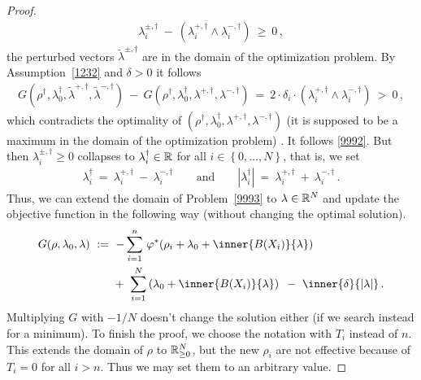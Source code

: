 \begin{proof}
\begin{gather*}
      \lambda_i^{\pm,\dagger}
      \!
      \ 
      -
      \ 
      (
      \lambda_i^{+,\dagger}
      \!
      \land
      \lambda_i^{-,\dagger}
      )
      \ 
      \ge 
      \ 
      0
      \,,
  \end{gather*}
  the perturbed vectors $\tilde{\lambda}^{\pm,\dagger}$ are  in the domain of the 
  optimization problem.
  By Assumption~\eqref{1232} and $\delta>0$ it follows
  \begin{align*}
  G
  \left( 
  \rho^\dagger,\lambda_0^\dagger,\tilde{\lambda}^{+,\dagger},\tilde{\lambda}^{-,\dagger}
  \right)
  \ 
  -
  \ 
  G
  \left( 
  \rho^\dagger,\lambda_0^\dagger,\lambda^{+,\dagger},\lambda^{-,\dagger}
  \right)
  \ 
  =
  \ 
  2
  \cdot
  \delta_i
  \cdot
      (
      \lambda_i^{+,\dagger}
      \!
      \land
      \lambda_i^{-,\dagger}
      )
  \ 
  >
  \ 
  0
  \,,
  \end{align*}
  which contradicts the optimality of
$
  (\rho^\dagger,\lambda_0^\dagger,\lambda^{+,\dagger},\lambda^{-,\dagger})
$
(it is supposed to be a maximum in the domain of the optimization problem)
.
It follows \eqref{9992}.
But then 
$
\lambda^{\pm,\dagger}_i
\ge 0
$
collapses to
$
\lambda_i^\dagger\in \mathbb{R}
$ 
for all
$i\in \left\{ 0,\ldots,N \right\}$, that is, we set
\begin{gather*}
 \lambda_i^\dagger
 \ 
 =
 \ 
 \lambda_i^{+,\dagger}
 \ 
 -
 \ 
 \lambda_i^{-,\dagger}
 \qquad
 \text{and}
 \qquad
|\lambda_i^\dagger|
\ 
=
\ 
\lambda_i^{+,\dagger}
\ 
+
\ 
\lambda_i^{-,\dagger}
\,.
\end{gather*}
Thus, we can extend the domain of Problem~\ref{9993} to $\lambda\in\mathbb{R}^{N}$ and update the objective function in the following way
(without changing the optimal solution).
\begin{align*}
  G
  (\rho,\lambda_0,\lambda)
  &
  \ 
  :=
  \ 
 -
\sum_{i=1} 
  ^n
    \,
  \varphi^*
  \!
  \left( 
    \rho_i
    +
\lambda_0
+
\inner
{B(X_i)}
{
\lambda
}
  \right)
  \\
  &
  \qquad
+
\ 
\sum_{i=1}^{N} 
  \left( 
\lambda_0
+
\inner
{B(X_i)}
{
\lambda
}
  \right)
  \,
  \ 
-
\ 
\inner
{\delta}
{
  |\lambda|
}
  \,.
\end{align*}
Multiplying $G$ with $-1/N$ doesn't change the solution either
(if we search instead for a minimum).
To finish the proof, we choose the notation with $T_i$ instead of $n$. This extends the domain of $\rho$ to $\mathbb{R}^N_{\ge 0}$, but the 
new $\rho_i$ are not effective because of $T_i=0$ for all $i>n$. 
Thus we may set them to an arbitrary value.
\end{proof}
